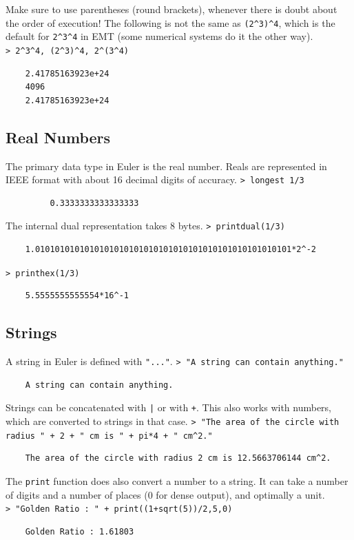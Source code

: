 \documentclass[11pt, a4paper]{article}
\newcommand{\emtcmd}[1]{\noindent\texttt{\textcolor{emtcommand}{>}\ #1}\par\smallskip}
\begin{document}
Make sure to use parentheses (round brackets), whenever there is doubt about the order of execution! The following is not the same as \texttt{(2\^{}3)\^{}4}, which is the default for \texttt{2\^{}3\^{}4} in EMT (some numerical systems do it the other way).
\emtcmd{2\^{}3\^{}4, (2\^{}3)\^{}4, 2\^{}(3\^{}4)}
\begin{verbatim}
    2.41785163923e+24
    4096
    2.41785163923e+24
\end{verbatim}

\subsection*{Real Numbers}

The primary data type in Euler is the real number. Reals are represented in IEEE format with about 16 decimal digits of accuracy.
\emtcmd{longest 1/3}
\begin{verbatim}
         0.3333333333333333
\end{verbatim}

The internal dual representation takes 8 bytes.
\emtcmd{printdual(1/3)}
\begin{verbatim}
    1.0101010101010101010101010101010101010101010101010101*2^-2
\end{verbatim}
\emtcmd{printhex(1/3)}
\begin{verbatim}
    5.5555555555554*16^-1
\end{verbatim}

\subsection*{Strings}

A string in Euler is defined with \texttt{"..."}.
\emtcmd{"A string can contain anything."}
\begin{verbatim}
    A string can contain anything.
\end{verbatim}

Strings can be concatenated with \texttt{|} or with \texttt{+}. This also works with numbers, which are converted to strings in that case.
\emtcmd{"The area of the circle with radius " + 2 + " cm is " + pi*4 + " cm\^{}2."}
\begin{verbatim}
    The area of the circle with radius 2 cm is 12.5663706144 cm^2.
\end{verbatim}

The \texttt{print} function does also convert a number to a string. It can take a number of digits and a number of places (0 for dense output), and optimally a unit.
\emtcmd{"Golden Ratio : " + print((1+sqrt(5))/2,5,0)}
\begin{verbatim}
    Golden Ratio : 1.61803
\end{verbatim}
\end{document}
